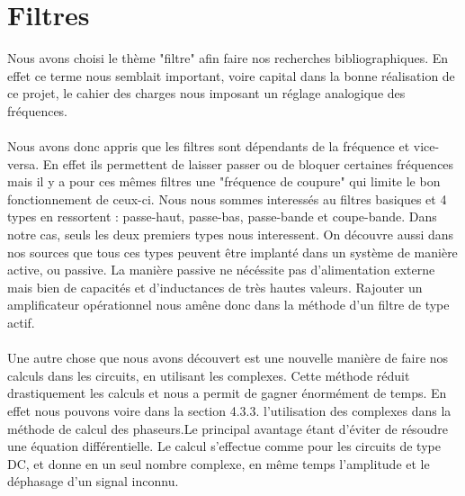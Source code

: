 \section{Filtres}
Nous avons choisi le thème "filtre" afin faire nos recherches bibliographiques. En effet ce terme nous semblait important, voire capital dans la bonne réalisation de ce projet, le cahier des charges nous imposant un réglage analogique des fréquences.


\paragraph{}
Nous avons donc appris que les filtres sont dépendants de la fréquence et vice-versa. En effet ils permettent de laisser passer ou de bloquer certaines fréquences mais il y a pour ces mêmes filtres une "fréquence de coupure" qui limite le bon fonctionnement de ceux-ci. Nous nous sommes interessés au filtres basiques et 4 types en ressortent : passe-haut, passe-bas, passe-bande et coupe-bande. Dans notre cas, seuls les deux premiers types nous interessent. On découvre aussi dans nos sources que tous ces types peuvent être implanté dans un système de manière active, ou passive. La manière passive ne nécéssite pas d'alimentation externe mais bien de capacités et d'inductances de très hautes valeurs. Rajouter un amplificateur opérationnel nous amêne donc dans la méthode d'un filtre de type actif.

\paragraph{}
Une autre chose que nous avons découvert est une nouvelle manière de faire nos calculs dans les circuits, en utilisant les complexes. Cette méthode réduit drastiquement les calculs et nous a permit de gagner énormément de temps. En effet nous pouvons voire dans la section 4.3.3. l'utilisation des complexes dans la méthode de calcul des phaseurs.Le principal avantage étant d'éviter de résoudre une équation différentielle. Le calcul s'effectue comme pour les circuits de type DC, et donne en un seul nombre complexe, en même temps  l'amplitude et le déphasage d'un signal inconnu.